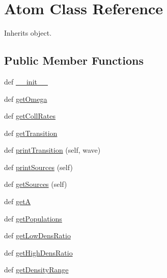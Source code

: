 \hypertarget{classpyneb_1_1core_1_1pynebcore_1_1_atom}{}\section{Atom Class Reference}
\label{classpyneb_1_1core_1_1pynebcore_1_1_atom}


Inherits object.

\subsection*{Public Member Functions}
\begin{DoxyCompactItemize}
\item 
def \hyperlink{classpyneb_1_1core_1_1pynebcore_1_1_atom_ac775ee34451fdfa742b318538164070e}{\+\_\+\+\_\+init\+\_\+\+\_\+}
\item 
def \hyperlink{classpyneb_1_1core_1_1pynebcore_1_1_atom_aaf6e92dda1e6d1aa7d06098b4e9a4e6d}{get\+Omega}
\item 
def \hyperlink{classpyneb_1_1core_1_1pynebcore_1_1_atom_ab4561af1ba7e3cc0c5323cf1e4d07454}{get\+Coll\+Rates}
\item 
def \hyperlink{classpyneb_1_1core_1_1pynebcore_1_1_atom_acf586a33a19e340d5da3ddd7fcf84f9c}{get\+Transition}
\item 
def \hyperlink{classpyneb_1_1core_1_1pynebcore_1_1_atom_a7c392bcd36d3e95a77920453058fc5af}{print\+Transition} (self, wave)
\item 
def \hyperlink{classpyneb_1_1core_1_1pynebcore_1_1_atom_a8391e786a420d63ed15d4efd3f04aad5}{print\+Sources} (self)
\item 
def \hyperlink{classpyneb_1_1core_1_1pynebcore_1_1_atom_ada746cff051b4eefa5f61aa4ad0e7fa6}{get\+Sources} (self)
\item 
def \hyperlink{classpyneb_1_1core_1_1pynebcore_1_1_atom_a17192519660871ef6a77e6bdad6f580d}{get\+A}
\item 
def \hyperlink{classpyneb_1_1core_1_1pynebcore_1_1_atom_af24a621cd6fd0b6b4e9d8dd178434976}{get\+Populations}
\item 
def \hyperlink{classpyneb_1_1core_1_1pynebcore_1_1_atom_a380df6d9d345514f05ff70b1c5796797}{get\+Low\+Dens\+Ratio}
\item 
def \hyperlink{classpyneb_1_1core_1_1pynebcore_1_1_atom_a83b623cde68b5b32ab0b711902d1f2ac}{get\+High\+Dens\+Ratio}
\item 
def \hyperlink{classpyneb_1_1core_1_1pynebcore_1_1_atom_afaf855a26eba2f91bc3fd078cb03b7ce}{get\+Density\+Range}
\item 

\end{DoxyCompactItemize}

